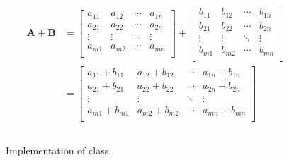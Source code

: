 
\begin{align*}
  \mathbf{A}+\mathbf{B} &=
  \left[
    \begin{matrix}
      a_{11} & a_{12} & \cdots & a_{1n} \\
      a_{21} & a_{22} & \cdots & a_{2n} \\
      \vdots & \vdots & \ddots & \vdots \\
      a_{m1} & a_{m2} & \cdots & a_{mn} \\
    \end{matrix}
  \right]
  +
  \left[
    \begin{matrix}
      b_{11} & b_{12} & \cdots & b_{1n} \\
      b_{21} & b_{22} & \cdots & b_{2n} \\
      \vdots & \vdots & \ddots & \vdots \\
      b_{m1} & b_{m2} & \cdots & b_{mn} \\
    \end{matrix}
  \right]
  \\
  &=
  \left[
    \begin{matrix}
      a_{11}+b_{11} & a_{12}+b_{12} & \cdots & a_{1n}+b_{1n} \\
      a_{21}+b_{21} & a_{22}+b_{22} & \cdots & a_{2n}+b_{2n} \\
      \vdots & \vdots & \ddots & \vdots \\
      a_{m1}+b_{m1} & a_{m2}+b_{m2} & \cdots & a_{mn}+b_{mn} \\
    \end{matrix}
  \right]
\end{align*}




\csharpsubsection{\csharp}



\begin{figure}[tbp]
  \inputminted[fontsize=\footnotesize]{csharp}{../src/csharp/matrix/Matrix.cs}
  \caption{Implementation of  class.}
  \label{fig:objects:matrix:lib}
\end{figure}


